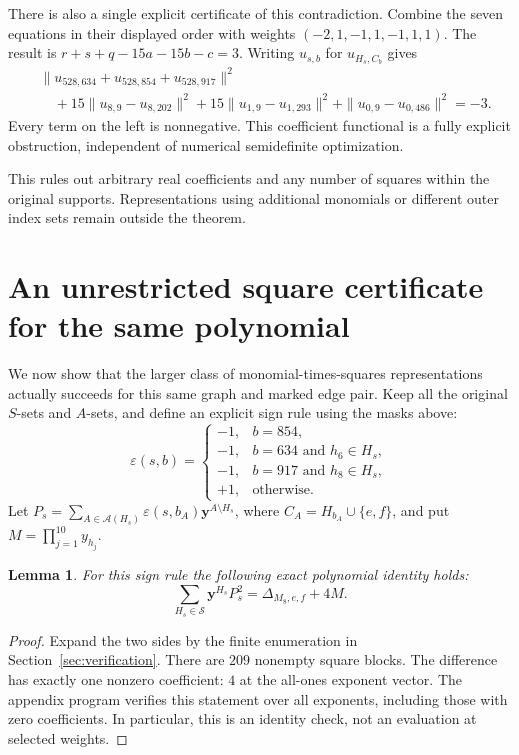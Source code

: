 \documentclass[11pt,a4paper]{article}
\newtheorem{lemma}[theorem]{Lemma}
\newcommand{\SSS}{\mathcal S}
\newcommand{\Asets}{\mathcal A}
\begin{document}
There is also a single explicit certificate of this contradiction.
Combine the seven equations in their displayed order with weights
$(-2,1,-1,1,-1,1,1)$. The result is
$r+s+q-15a-15b-c=3$. Writing $u_{s,b}$ for $u_{H_s,C_b}$ gives
\begin{equation}\label{eq:four-norms}
\begin{aligned}
 &\|u_{528,634}+u_{528,854}+u_{528,917}\|^2\\
 &\quad+15\|u_{8,9}-u_{8,202}\|^2
       +15\|u_{1,9}-u_{1,293}\|^2
       +\|u_{0,9}-u_{0,486}\|^2=-3.
\end{aligned}
\end{equation}
Every term on the left is nonnegative. This coefficient functional
is a fully explicit obstruction, independent of numerical
semidefinite optimization.

This rules out arbitrary real coefficients and any number of squares
within the original supports. Representations using additional
monomials or different outer index sets remain outside the theorem.

\section{An unrestricted square certificate for the same polynomial}
\label{sec:repair}

We now show that the larger class of monomial-times-squares
representations actually succeeds for this same graph and marked
edge pair. Keep all the original $S$-sets and $A$-sets, and define
an explicit sign rule using the masks above:
\begin{equation}\label{eq:sign-rule}
 \varepsilon(s,b)=
 \begin{cases}
 -1,& b=854,\\
 -1,& b=634\text{ and }h_6\in H_s,\\
 -1,& b=917\text{ and }h_8\in H_s,\\
 +1,&\text{otherwise}.
 \end{cases}
\end{equation}
Let $P_s=\sum_{A\in\Asets(H_s)}
\varepsilon(s,b_A)\boldsymbol y^{A\setminus H_s}$, where
$C_A=H_{b_A}\cup\{e,f\}$, and put
$M=\prod_{j=1}^{10}y_{h_j}$.

\begin{lemma}\label{lem:surplus}
For this sign rule the following exact polynomial identity holds:
\begin{equation}\label{eq:surplus}
 \sum_{H_s\in\SSS}\boldsymbol y^{H_s}P_s^2
 =\Delta_{M_8,e,f}+4M.
\end{equation}
\end{lemma}
\begin{proof}
Expand the two sides by the finite enumeration in
Section~\ref{sec:verification}. There are $209$ nonempty square
blocks. The difference has exactly one nonzero coefficient:
$4$ at the all-ones exponent vector. The appendix program
verifies this statement over all exponents, including those with
zero coefficients. In particular, this is an identity check, not
an evaluation at selected weights.
\end{proof}
\end{document}
